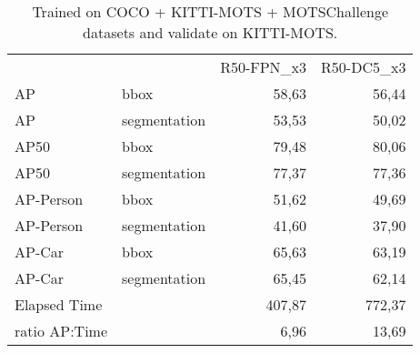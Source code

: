 \documentclass[12pt,a4paper,twocolumn,twoside]{article}
\begin{document}
\begin{table*}[]
    \centering
\begin{tabularx}{}{|l|l|r|r|} \hline
              &              & \multicolumn{1}{l|}{R50-FPN\_x3} & \multicolumn{1}{l|}{R50-DC5\_x3} \\ \cline{1-4}
AP            & bbox         & 58,63                            & 56,44                            \\ \cline{1-4}
AP            & segmentation & 53,53                            & 50,02                            \\ \cline{1-4}
AP50          & bbox         & 79,48                            & 80,06                            \\ \cline{1-4}
AP50          & segmentation & 77,37                            & 77,36                            \\ \cline{1-4}
AP-Person     & bbox         & 51,62                            & 49,69                            \\ \cline{1-4}
AP-Person     & segmentation & 41,60                            & 37,90                            \\ \cline{1-4}
AP-Car        & bbox         & 65,63                            & 63,19                            \\ \cline{1-4}
AP-Car        & segmentation & 65,45                            & 62,14                            \\ \cline{1-4}
Elapsed Time  &              & 407,87                           & 772,37                           \\ \cline{1-4}
ratio AP:Time &              & 6,96                             & 13,69                            \\ \cline{1-4} 
\end{tabularx}
\caption{\label{table:task_b_COCO_motschallenge}Trained on COCO + KITTI-MOTS + MOTSChallenge datasets and validate on KITTI-MOTS.}
\end{table*}
\end{document}
